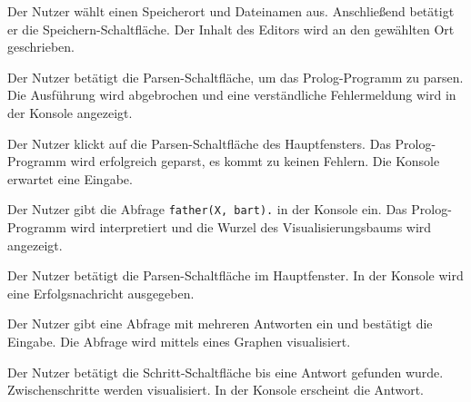 \documentclass[parskip=full,11pt,twoside]{scrartcl}
\begin{document}
{Der Nutzer wählt einen Speicherort und Dateinamen aus. Anschließend betätigt er die Speichern-Schaltfläche.}
{Der Inhalt des Editors wird an den gewählten Ort geschrieben.}



{Der Nutzer betätigt die Parsen-Schaltfläche, um das Prolog-Programm zu parsen.}
{Die Ausführung wird abgebrochen und eine verständliche Fehlermeldung wird in der Konsole angezeigt.}



{Der Nutzer klickt auf die Parsen-Schaltfläche des Hauptfensters.}
{Das Prolog-Programm wird erfolgreich geparst, es kommt zu keinen Fehlern. Die Konsole erwartet eine Eingabe.}

{Der Nutzer gibt die Abfrage \texttt{father(X, bart).} in der Konsole ein.}
{Das Prolog-Programm wird interpretiert und die Wurzel des Visualisierungsbaums wird angezeigt.}



{Der Nutzer betätigt die Parsen-Schaltfläche im Hauptfenster.}
{In der Konsole wird eine Erfolgsnachricht ausgegeben.}

{Der Nutzer gibt eine Abfrage mit mehreren Antworten ein und bestätigt die Eingabe.}
{Die Abfrage wird mittels eines Graphen visualisiert.}

{Der Nutzer betätigt die Schritt-Schaltfläche bis eine Antwort gefunden wurde.}
{Zwischenschritte werden visualisiert. In der Konsole erscheint die Antwort.}
\end{document}
